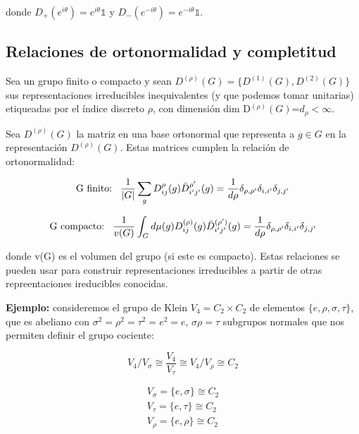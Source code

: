 \documentclass{article}
\begin{document}
    donde $D_+(e^{i\theta})=e^{i\theta}\mathds{1}$ y $D_-(e^{-i\theta})=e^{-i\theta}\mathds{1}$.
    
    \subsection{Relaciones de ortonormalidad y completitud}
    
    Sea un grupo finito o compacto y sean $D^{(\rho)}(G)=\lbrace D^{(1)}(G), D^{(2)}(G)\rbrace$ sus representaciones irreducibles inequivalentes (y que podemos tomar unitarias) etiqueadas por el índice discreto $\rho$, con dimensión dim D$^{(\rho)}(G)$=$d_\rho <\infty$.
    
    Sea $D^{(\rho)}(G)$ la matriz en una base ortonormal que representa a $g\in G$ en la representación $D^{(\rho )}(G)$. Estas matrices cumplen la relación de ortonormalidad:
    
    $$\text{G finito:} \hspace{0.3cm} \frac{1}{|G|}\sum _g D_{ij}^\rho (g) \bar{D}_{i'j'}^{\rho '}(g)=\frac{1}{d \rho}\delta _{\rho , \rho '}\delta _{i, i'}\delta _{j,j'}$$
    
    $$\text{G compacto:} \hspace{0.3cm} \frac{1}{v(G)}\int _G d\mu (g) D_{ij}^{(\rho )} (g) \bar{D}_{i'j'}^{ (\rho ')}(g)=\frac{1}{d\rho}\delta _{\rho , \rho '}\delta _{i, i'}\delta _{j,j'}$$
    
    donde v(G) es el volumen del grupo (si este es compacto). Estas relaciones se pueden usar para construir representaciones irreducibles a partir de otras repreentaciones ireducibles conocidas.
    
    \smallskip
    
    \textbf{Ejemplo:} consideremos el grupo de Klein $V_4=C_2 \times C_2$ de elementos $\lbrace e, \rho , \sigma , \tau \rbrace $, que es abeliano con $\sigma ^2 = \rho ^2 = \tau ^2 =e^2 =e$, $\sigma \rho = \tau$ subgrupos normales que nos permiten definir el grupo cociente:
    
    $$V_4/V_\sigma \cong \frac{V_4}{V_\tau}\cong V_4/V_\rho \cong C_2 $$
    
    $$\begin{array}{c}
         V_\sigma =\lbrace e, \sigma \rbrace \cong C_2  \\
         V_\tau = \lbrace e, \tau \rbrace \cong C_2 \\
         V_\rho = \lbrace e, \rho \rbrace  \cong C_2
    \end{array}$$
    
\end{document}
